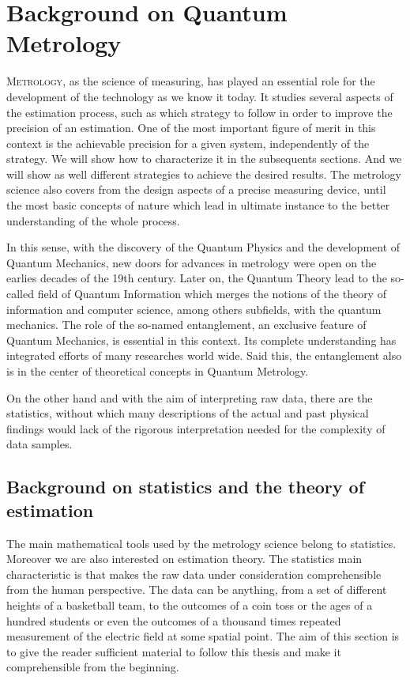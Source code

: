 \section[Backgroud on Quantum Metrology]
{Background on Quantum Metrology}


\vspace{0pt}
\lettrine[lines=2, findent=3pt,nindent=0pt]{M}{etrology}, as the science of measuring, has played an essential role for the development of the technology as we know it today.
It studies several aspects of the estimation process, such as which strategy to follow in order to improve the precision of an estimation.
One of the most important figure of merit in this context is the achievable precision for a given system, independently of the strategy.
We will show how to characterize it in the subsequents sections.
And we will show as well different strategies to achieve the desired results.
The metrology science also covers from the design aspects of a precise measuring device, until the most basic concepts of nature which lead in ultimate instance to the better understanding of the whole process.

In this sense, with the discovery of the Quantum Physics and the development of Quantum Mechanics, new doors for advances in metrology were open on the earlies decades of the 19th century.
Later on, the Quantum Theory lead to the so-called field of Quantum Information which merges the notions of the theory of information and computer science, among others subfields, with the quantum mechanics.
The role of the so-named entanglement, an exclusive feature of Quantum Mechanics, is essential in this context.
Its complete understanding has integrated efforts of many researches world wide.
Said this, the entanglement also is in the center of theoretical concepts in Quantum Metrology.

On the other hand and with the aim of interpreting raw data, there are the statistics, without which many descriptions of the actual and past physical findings would lack of the rigorous interpretation needed for the complexity of data samples.



\subsection{Background on statistics and the theory of estimation}
The main mathematical tools used by the metrology science belong to statistics.
Moreover we are also interested on estimation theory.
The statistics main characteristic is that makes the raw data under consideration comprehensible from the human perspective.
The data can be anything, from a set of different heights of a basketball team, to the outcomes of a coin toss or the ages of a hundred students or even the outcomes of a thousand times repeated measurement of the electric field at some spatial point.
The aim of this section is to give the reader sufficient material to follow this thesis and make it comprehensible from the beginning.


